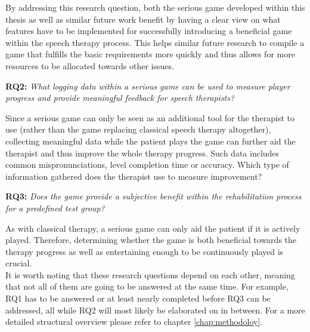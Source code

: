 \documentclass[draft,final]{vutinfth} %
\begin{document}
By addressing this research question, both the serious game developed within this thesis as well as similar future work benefit by having a clear view on what features have to be implemented for successfully introducing a beneficial game within the speech therapy process. This helps similar future research to compile a game that fulfills the basic requirements more quickly and thus allows for more resources to be allocated towards other issues.

\begin{center}
\textbf{RQ2:} \textit{What logging data within a serious game can be used to measure player progress and provide meaningful feedback for speech therapists?}
\end{center}

Since a serious game can only be seen as an additional tool for the therapist to use (rather than the game replacing classical speech therapy altogether), collecting meaningful data while the patient plays the game can further aid the therapist and thus improve the whole therapy progress. Such data includes common mispronunciations, level completion time or accuracy. Which type of information gathered does the therapist use to measure improvement?

\begin{center}
\textbf{RQ3:} \textit{Does the game provide a subjective benefit within the rehabilitation process for a predefined test group?}
\end{center}

As with classical therapy, a serious game can only aid the patient if it is actively played. Therefore, determining whether the game is both beneficial towards the therapy progress as well as entertaining enough to be continuously played is crucial. \\
It is worth noting that these research questions depend on each other, meaning that not all of them are going to be answered at the same time. For example, RQ1 has to be answered or at least nearly completed before RQ3 can be addressed, all while RQ2 will most likely be elaborated on in between. For a more detailed structural overview please refer to chapter \ref{chap:methodoloy}.
\end{document}
